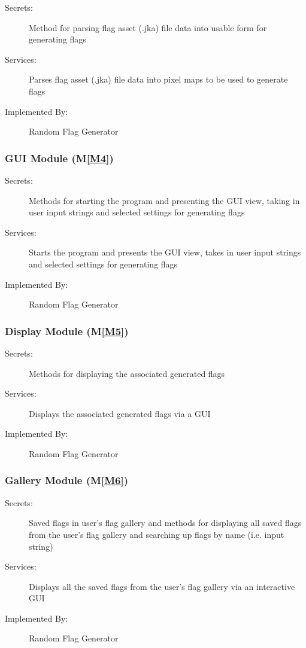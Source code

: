 \documentclass[12pt, titlepage]{article}
\newcommand{\mref}[1]{M\ref{#1}}
\begin{document}
\begin{description}
\item[Secrets:] Method for parsing flag asset (.jka) file data into usable
  form for generating flags
\item[Services:] Parses flag asset (.jka) file data into pixel maps to be used
  to generate flags
\item[Implemented By:] Random Flag Generator
\end{description}

\subsubsection{GUI Module (\mref{M4})}

\begin{description}
\item[Secrets:] Methods for starting the program and presenting the GUI view,
  taking in user input strings and selected settings for generating flags
\item[Services:] Starts the program and presents the GUI view, takes in user
  input strings and selected settings for generating flags
\item[Implemented By:] Random Flag Generator
\end{description}

\subsubsection{Display Module (\mref{M5})}

\begin{description}
\item[Secrets:] Methods for displaying the associated generated flags
\item[Services:] Displays the associated generated flags via a GUI
\item[Implemented By:] Random Flag Generator
\end{description}

\subsubsection{Gallery Module (\mref{M6})}

\begin{description}
\item[Secrets:] Saved flags in user's flag gallery and methods for displaying
  all saved flags from the user's flag gallery and searching up flags by
  name (i.e. input string)
\item[Services:] Displays all the saved flags from the user's flag gallery via
  an interactive GUI
\item[Implemented By:] Random Flag Generator
\end{description}
\end{document}
